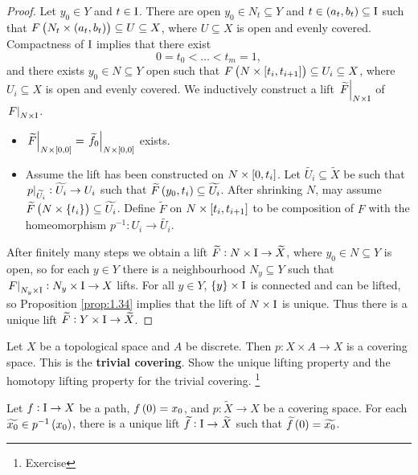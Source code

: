 \begin{proof}
Let $ y_0 \in Y $ and $ t \in \mathrm{I} $. There are open $ y_0 \in N_t \subseteq Y $ and $ t \in \br{a_t, b_t} \subseteq \I $ such that $ F\br{N_t \times \br{a_t, b_t}} \subseteq U \subseteq X $, where $ U \subseteq X $ is open and evenly covered. Compactness of $ \mathrm{I} $ implies that there exist
$$ 0 = t_0 < \dots < t_m = 1, $$
and there exists $ y_0 \in N \subseteq Y $ open such that $ F\br{N \times \sbr{t_i, t_{i + 1}}} \subseteq U_i \subseteq X $, where $ U_i \subseteq X $ is open and evenly covered. We inductively construct a lift $ \left. \widetilde{F} \right|_{N \times \mathrm{I}} $ of $ \left. F \right|_{N \times \mathrm{I}} $.
\begin{itemize}
\item $ \eval{\widetilde{F}}_{N \times \sbr{0, 0}} = \eval{\widetilde{f_0}}_{N \times \sbr{0, 0}} $ exists.
\item Assume the lift has been constructed on $ N \times \sbr{0, t_i} $. Let $ \widetilde{U_i} \subseteq \widetilde{X} $ be such that $ \left. p \right|_{\widetilde{U_i}} : \widetilde{U_i} \to U_i $ such that $ \widetilde{F}\br{y_0, t_i} \subseteq \widetilde{U_i} $. After shrinking $ N $, may assume $ \widetilde{F}\br{N \times \cbr{t_i}} \subseteq \widetilde{U_i} $. Define $ \widetilde{F} $ on $ N \times \sbr{t_i, t_{i + 1}} $ to be composition of $ F $ with the homeomorphism $ p^{-1} : U_i \to \widetilde{U_i} $.
\end{itemize}
After finitely many steps we obtain a lift $ \widetilde{F} : N \times \mathrm{I} \to \widetilde{X} $, where $ y_0 \in N \subseteq Y $ is open, so for each $ y \in Y $ there is a neighbourhood $ N_y \subseteq Y $ such that $ \left. F \right|_{N_y \times \mathrm{I}} : N_y \times \mathrm{I} \to X $ lifts. For all $ y \in Y $, $ \cbr{y} \times \I $ is connected and can be lifted, so Proposition \ref{prop:1.34} implies that the lift of $ N \times \mathrm{I} $ is unique. Thus there is a unique lift $ \widetilde{F} : Y \times \mathrm{I} \to \widetilde{X} $.
\end{proof}

\begin{example*}
Let $ X $ be a topological space and $ A $ be discrete. Then $ p : X \times A \to X $ is a covering space. This is the \textbf{trivial covering}. Show the unique lifting property and the homotopy lifting property for the trivial covering. \footnote{Exercise}
\end{example*}

\begin{corollary}
Let $ f : \mathrm{I} \to X $ be a path, $ f\br{0} = x_0 $, and $ p : \widetilde{X} \to X $ be a covering space. For each $ \widetilde{x_0} \in p^{-1}\br{x_0} $, there is a unique lift $ \widetilde{f} : \mathrm{I} \to \widetilde{X} $ such that $ \widetilde{f}\br{0} = \widetilde{x_0} $.
\end{corollary}

